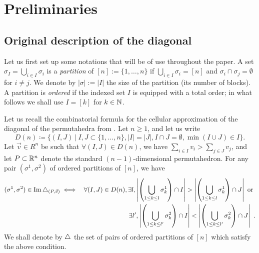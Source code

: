 
\section{Preliminaries}
\label{s:prelim}

\subsection{Original description of the diagonal}

Let us first set up some notations that will be of use throughout the paper. 
A set $\sigma_I = \bigcup_{i\in I} \sigma_i$ is a \emph{partition} of $[n]:=\{1,\ldots,n\}$ if $\bigcup_{i\in I} \sigma_i = [n]$ and $\sigma_i \cap \sigma_j = \emptyset$ for $i \neq j$.
We denote by $|\sigma|:=|I|$ the size of the partition (its number of blocks).
A partition is \emph{ordered} if the indexed set $I$ is equipped with a total order; in what follows we shall use $I=[k]$ for $k \in \mathbb N$. 

Let us recall the combinatorial formula for the cellular approximation of the diagonal of the permutahedra from \cite[Theorem 3.16]{LA21}.
Let $n\geq 1$, and let us write \[ D(n) \coloneqq \{(I,J) \ | \ I,J\subset\{1,\ldots,n\}, |I|=|J|, I\cap J=\emptyset, \min(I\cup J)\in I \}. \] 
Let $\vec v \in R^n$ be such that $\forall (I,J) \in D(n)$, we have $\sum_{i \in I} v_i > \sum_{j \in J} v_j$, and let $P\subset \mathbb R^n$ denote the standard $(n-1)$-dimensional permutahedron.
For any pair $(\sigma^1,\sigma^2)$ of ordered partitions of $[n]$, we have
\begin{eqnarray*}
    (\sigma^1,\sigma^2)\in \operatorname{Im}\triangle_{(P,\vec v)} 
    & \iff & \forall (I,J) \in D(n), \exists l , 
    \left| \left(\bigcup_{1\leq k \leq l} \sigma^1_{k} \right)\cap I \right|
    >
    \left| \left(\bigcup_{1\leq k \leq l} \sigma^1_{k} \right)\cap J \right| \text{ or } \\
    && \exists l' , 
    \left| \left(\bigcup_{1\leq k \leq l'} \sigma^2_{k} \right)\cap I \right|
    <
    \left| \left(\bigcup_{1\leq k \leq l'} \sigma^2_{k} \right)\cap J \right|  \ . 
\end{eqnarray*}
We shall denote by $\triangle$ the set of pairs of ordered partitions of $[n]$ which satisfy the above condition. 

